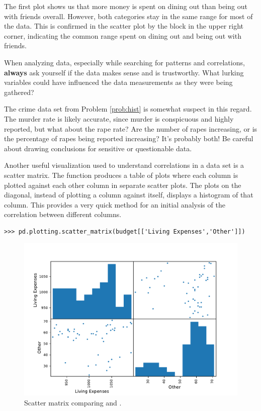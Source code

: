The first plot shows us that more money is spent on dining out than being out with friends overall.
However, both categories stay in the same range for most of the data.
This is confirmed in the scatter plot by the block in the upper right corner, indicating the common range spent on dining out and being out with friends.

\begin{warn}
When analyzing data, especially while searching for patterns and correlations, \textbf{always} ask yourself if the data makes sense and is trustworthy.
What lurking variables could have influenced the data measurements as they were being gathered?

The crime data set from Problem \ref{prob:hist} is somewhat suspect in this regard.
The murder rate is likely accurate, since murder is conspicuous and highly reported, but what about the rape rate?
Are the number of rapes increasing, or is the percentage of rapes being reported increasing? 
It's probably both!
Be careful about drawing conclusions for sensitive or questionable data.
\end{warn}

Another useful visualization used to understand correlations in a data set is a scatter matrix. 
The function  produces a table of plots where each column is plotted against each other column in separate scatter plots.
The plots on the diagonal, instead of plotting a column against itself, displays a histogram of that column.
This provides a very quick method for an initial analysis of the correlation between different columns.

\begin{lstlisting}
>>> pd.plotting.scatter_matrix(budget[['Living Expenses','Other']])
\end{lstlisting}

\begin{figure}[H]
    \includegraphics[width=.7\textwidth]{figures/scatter_table.pdf}
    \caption{Scatter matrix comparing  and .}
\end{figure}


